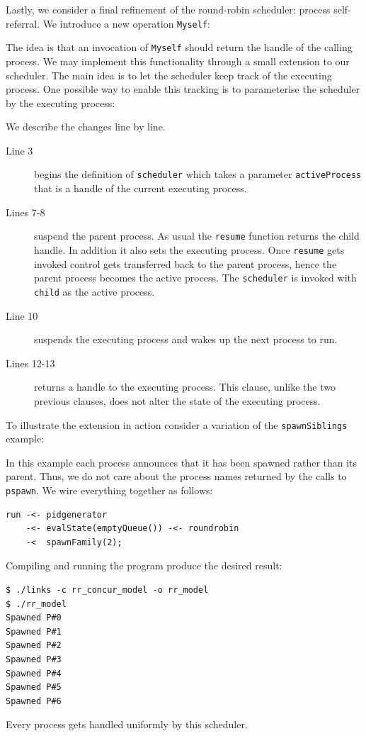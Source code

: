 \documentclass[12pt,mscres,cdtppar,twoside,openright,logo,rightchapter,normalheadings]{infthesis}
\newcommand{\snippet}[1]{}
\theoremstyle{definition}
\begin{document}
Lastly, we consider a final refinement of the round-robin scheduler:
process self-referral. We introduce a new operation
\lstinline$Myself$:
%
\snippet{myself.links}
%
The idea is that an invocation of \lstinline$Myself$ should return the
handle of the calling process. We may implement this functionality
through a small extension to our scheduler. The main idea is to let
the scheduler keep track of the executing process. One possible way to
enable this tracking is to parameterise the scheduler by the executing
process:
%

%
We describe the changes line by line.
\begin{description}
\item[Line 3] begins the definition of \lstinline$scheduler$ which
  takes a parameter \lstinline$activeProcess$ that is a handle of the
  current executing process.
\item[Lines 7-8] suspend the parent process. As usual the
  \lstinline$resume$ function returns the child handle. In addition it
  also sets the executing process. Once \lstinline$resume$ gets
  invoked control gets transferred back to the parent process, hence
  the parent process becomes the active process.  The
  \lstinline$scheduler$ is invoked with \lstinline$child$ as the
  active process.
\item[Line 10] suspends the executing process and wakes up the next
  process to run.
\item[Lines 12-13] returns a handle to the executing process. This
  clause, unlike the two previous clauses, does not alter the state of
  the executing process.
\end{description}

To illustrate the extension in action consider a variation of the
\lstinline$spawnSiblings$ example:
%

%
In this example each process announces that it has been spawned rather
than its parent. Thus, we do not care about the process names returned
by the calls to \lstinline$pspawn$. We wire everything together as
follows:
%
\begin{lstlisting}
run -<- pidgenerator 
    -<- evalState(emptyQueue()) -<- roundrobin 
    -<  spawnFamily(2);
\end{lstlisting}
%
Compiling and running the program produce the desired result:
%
\begin{lstlisting}[style=terminal]
$ ./links -c rr_concur_model -o rr_model
$ ./rr_model
Spawned P#0
Spawned P#1
Spawned P#2
Spawned P#3
Spawned P#4
Spawned P#5
Spawned P#6
\end{lstlisting}
%
Every process gets handled uniformly by this scheduler.
\end{document}

